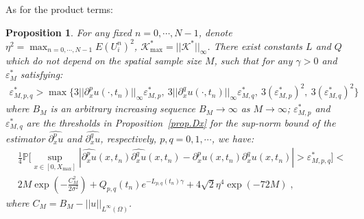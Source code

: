 \documentclass[a4paper,11pt]{article}
\newtheorem{prop}{Proposition}[section]
\begin{document}
As for the product terms:
\begin{prop}\label{prop.Dxx}
For any fixed $n=0,\cdots,N-1$, denote $\eta^2 = \max_{n=0,\cdots,N-1}E(U_i^n)^2$, $\mathcal{K}^*_{\max}=||\mathcal{K}^*||_\infty$. There exist constants $L$ and $Q$ which do not depend on the spatial sample size $M$, such that for any $\gamma>0$ and $\varepsilon_M^*$ satisfying:
\begin{align*}
\varepsilon_{M,p,q}^*>\max\{3||\partial_x^pu(\cdot,t_n)||_\infty\varepsilon^*_{M,p},~3||\partial_x^qu(\cdot,t_n)||_\infty\varepsilon^*_{M,q},~3(\varepsilon^*_{M,p})^2,~3(\varepsilon^*_{M,q})^2\}
\end{align*}
where $B_M$ is an arbitrary increasing sequence $B_M\to\infty$ as $M\to\infty$; $\varepsilon^*_{M,p}$ and $\varepsilon^*_{M,q}$ are the thresholds in Proposition~\ref{prop.Dx} for the sup-norm bound of the estimator $\widehat{\partial_x^pu}$ and $\widehat{\partial_x^qu}$, respectively, $p,q=0,1,\cdots$, we have:
\begin{align}
&\frac{1}{4}\mathbb{P}\Big[\sup_{x\in[0,X_{\max}]}|\widehat{\partial_x^pu}(x,t_n)\widehat{\partial_x^qu}(x,t_n)-\partial_x^pu(x,t_n)\partial_x^qu(x,t_n)|>\varepsilon_{M,p,q}^*\Big]<\nonumber\\
&2M \exp(-\frac{C_M^2}{2\sigma^2})+Q_{p,q}(t_n)e^{-L_{p,q}(t_n)\gamma}+4\sqrt{2}\eta^4\exp(-72M)\;,
\end{align}	
where $C_M = B_M-||u||_{L^\infty(\Omega)}$.
\end{prop}
\end{document}
